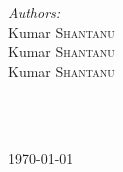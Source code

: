 \begin{titlepage}
\begin{minipage}{0.4\textwidth}
\begin{center} \large
\emph{Authors:}\\
Kumar \textsc{Shantanu}  \\
Kumar \textsc{Shantanu}  \\
Kumar \textsc{Shantanu}  \\
\end{center}
\end{minipage}
~
\begin{minipage}{0.4\textwidth}

\end{minipage}\\[2cm]



{\large \today}\\[2cm] %





\vfill %

\end{titlepage}

